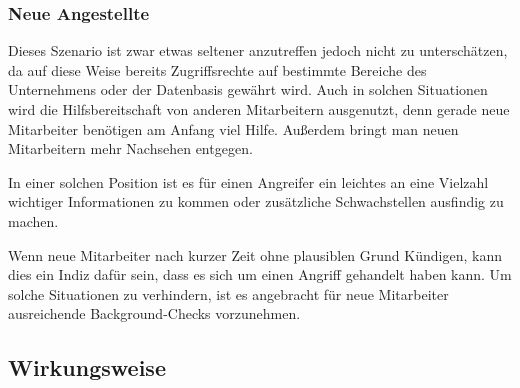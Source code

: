 \subsubsection*{Neue Angestellte}\label{neueangestellte}
Dieses Szenario ist zwar etwas seltener anzutreffen jedoch nicht zu unterschätzen, da auf diese
Weise bereits Zugriffsrechte auf bestimmte Bereiche des Unternehmens oder der Datenbasis gewährt wird.
Auch in solchen Situationen wird die Hilfsbereitschaft von anderen Mitarbeitern ausgenutzt, denn
gerade neue Mitarbeiter benötigen am Anfang viel Hilfe.
Außerdem bringt man neuen Mitarbeitern mehr Nachsehen entgegen.

In einer solchen Position ist es für einen Angreifer ein leichtes an eine Vielzahl wichtiger
Informationen zu kommen oder zusätzliche Schwachstellen ausfindig zu machen.

Wenn neue Mitarbeiter nach kurzer Zeit ohne plausiblen Grund Kündigen, kann dies ein Indiz dafür sein,
dass es sich um einen Angriff gehandelt haben kann.
Um solche Situationen zu verhindern, ist es angebracht für neue Mitarbeiter ausreichende Background-Checks vorzunehmen. \cite{hacking-the-human}

\subsection{Wirkungsweise}\label{sec:wirkungsweise}
